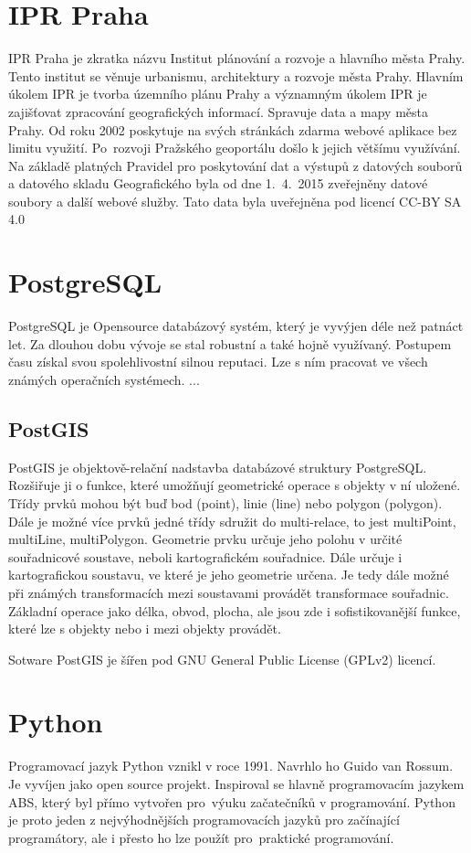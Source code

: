 \section{IPR Praha}
\label{IPR Praha}
IPR Praha je zkratka názvu Institut plánování a rozvoje a hlavního města Prahy. 
Tento institut se věnuje urbanismu, architektury a rozvoje města Prahy. Hlavním
úkolem IPR je tvorba územního plánu Prahy a významným úkolem IPR je zajišťovat
zpracování geografických informací. Spravuje data a mapy města Prahy. Od roku 
2002 poskytuje na svých stránkách zdarma webové aplikace bez limitu využití. 
Po~rozvoji Pražského geoportálu došlo k jejich většímu využívání.  Na základě 
platných Pravidel pro poskytování dat a  výstupů z datových souborů a datového 
skladu Geografického byla od dne 1.~4.~2015 zveřejněny datové soubory a další 
webové služby. Tato data byla uveřejněna pod licencí CC-BY SA 4.0 \cite{IPR}


\section{PostgreSQL}
\label{PostgreSQL}
PostgreSQL je Opensource databázový systém, který je vyvýjen déle než patnáct
let. Za dlouhou dobu vývoje se stal robustní a také hojně využívaný.
Postupem času získal svou spolehlivostní silnou reputaci.
Lze s ním pracovat ve všech známých operačních systémech. ...
\cite{PostgreSQL}

\subsection{PostGIS}
\label{PostGIS}
PostGIS je objektově-relační nadstavba databázové struktury PostgreSQL.
Rozšiřuje ji o funkce, které umožňují geometrické operace s objekty v ní uložené.
Třídy prvků mohou být buď bod (point), linie (line) nebo polygon (polygon).
Dále je možné více prvků jedné třídy sdružit do multi-relace, 
to jest  multiPoint, multiLine, multiPolygon.
Geometrie prvku určuje jeho polohu v určité souřadnicové soustave, neboli 
kartografickém souřadnice. Dále určuje i kartografickou soustavu, ve které je 
jeho geometrie určena. Je tedy dále možné při známých transformacích mezi
soustavami provádět transformace souřadnic. Základní operace jako délka, obvod,
plocha, ale jsou zde i sofistikovanější funkce, které lze s objekty nebo i mezi 
objekty provádět.

Sotware PostGIS je šířen pod GNU General Public License (GPLv2) licencí.


\section{Python}
\label{Python}
Programovací jazyk Python vznikl v roce 1991. Navrhlo ho Guido van Rossum. 
Je vyvíjen jako open source projekt. Inspiroval se hlavně programovacím jazykem
ABS, který byl přímo vytvořen pro~výuku začatečníků v programování. Python je 
proto jeden z nejvýhodnějších programovacích jazyků pro začínající programátory,
ale i přesto ho lze použít pro~praktické programování. 

